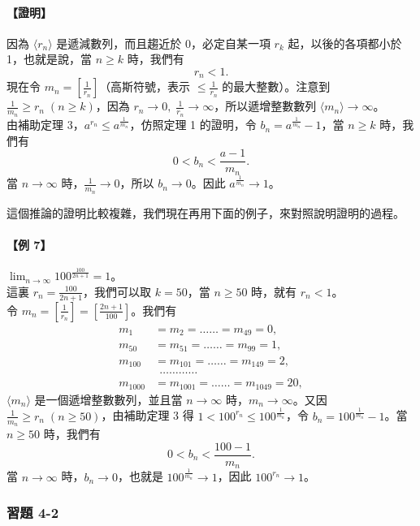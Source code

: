 \paragraph{【證明】} 因為 $\langle r_n \rangle$ 是遞減數列，而且趨近於 0，必定自某一項 $r_k$ 起，以後的各項都小於 1，也就是說，當 $n \ge k$ 時，我們有
\[
r_n < 1.
\]
現在令 $m_n = [\frac{1}{r_n}]$（高斯符號，表示 $\le \frac{1}{r_n}$ 的最大整數）。注意到 $\frac{1}{m_n} \ge r_n\; (n \ge k)$，因為 $r_n \to 0,\; \frac{1}{r_n} \to \infty$，所以遞增整數數列 $\langle m_n \rangle \to \infty$。\\
由補助定理 3，$a^{r_n} \le a^{\frac{1}{m_n}}$，仿照定理 1 的證明，令 $b_n = a^{\frac{1}{m_n}} - 1$，當 $n \ge k$ 時，我們有
\[
0 < b_n < \frac{a-1}{m_n}.
\]
當 $n \to \infty$ 時，$\frac{1}{m_n} \to 0$，所以 $b_n \to 0$。因此 $a^{\frac{1}{m_n}} \to 1$。

這個推論的證明比較複雜，我們現在再用下面的例子，來對照說明證明的過程。

\paragraph{【例 7】} $\lim_{n\to\infty} 100^{\frac{100}{2n+1}} = 1$。\\
這裏 $r_n = \frac{100}{2n+1}$，我們可以取 $k = 50$，當 $n \ge 50$ 時，就有 $r_n < 1$。\\
令 $m_n = [\frac{1}{r_n}] = [\frac{2n+1}{100}]$。我們有
\begin{align*}
m_1 &= m_2 = \dots\dots = m_{49} = 0, \\
m_{50} &= m_{51} = \dots\dots = m_{99} = 1, \\
m_{100} &= m_{101} = \dots\dots = m_{149} = 2, \\
&\ \ \dots\dots\dots\dots \\
m_{1000} &= m_{1001} = \dots\dots = m_{1049} = 20,
\end{align*}
$\langle m_n \rangle$ 是一個遞增整數數列，並且當 $n \to \infty$ 時，$m_n \to \infty$。又因 $\frac{1}{m_n} \ge r_n\; (n \ge 50)$，由補助定理 3 得 $1 < 100^{r_n} \le 100^{\frac{1}{m_n}}$，令 $b_n = 100^{\frac{1}{m_n}} - 1$。當 $n \ge 50$ 時，我們有
\[
0 < b_n < \frac{100-1}{m_n}.
\]
當 $n \to \infty$ 時，$b_n \to 0$，也就是 $100^{\frac{1}{m_n}} \to 1$，因此 $100^{r_n} \to 1$。

\subsubsection*{習題 4-2}

